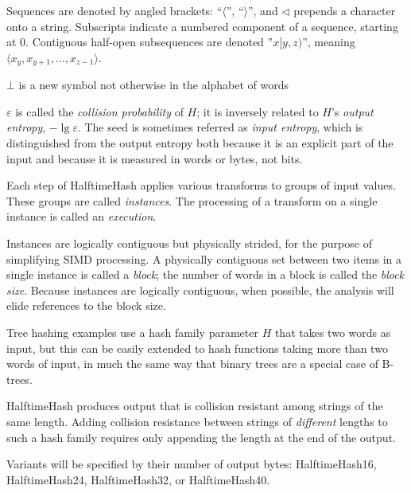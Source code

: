\documentclass{llncs}
\begin{document}
Sequences are denoted by angled brackets: ``$\langle$'', ``$\rangle$'', and $\triangleleft$ prepends a character onto a string.
Subscripts indicate a numbered component of a sequence, starting at 0.
Contiguous half-open subsequences are denoted ''$x[y,z)$'', meaning $\langle x_y, x_{y+1}, \dots, x_{z-1} \rangle$.

$\bot$ is a new symbol not otherwise in the alphabet of words

$\varepsilon$ is called the {\em collision probability} of $H$; it is inversely related to $H$'s {\em output entropy}, $-\lg \varepsilon$.
The seed is sometimes referred as {\em input entropy}, which is distinguished from the output entropy both because it is an explicit part of the input and because it is measured in words or bytes, not bits.

Each step of HalftimeHash applies various transforms to groups of input values.
These groups are called {\em instances}.
The processing of a transform on a single instance is called an {\em execution}.

Instances are logically contiguous but physically strided, for the purpose of simplifying SIMD processing.
A physically contiguous set between two items in a single instance is called a {\em block}; the number of words in a block is called the {\em block size}.
Because instances are logically contiguous, when possible, the analysis will elide references to the block size.

Tree hashing examples use a hash family parameter $H$ that takes two words as input, but this can be easily extended to hash functions taking more than two words of input, in much the same way that binary trees are a special case of B-trees.

HalftimeHash produces output that is collision resistant among strings of the same length.
Adding collision resistance between strings of {\em different} lengths to such a hash family requires only appending the length at the end of the output.

Variants will be specified by their number of output bytes: HalftimeHash16, HalftimeHash24, HalftimeHash32, or HalftimeHash40.
\end{document}
